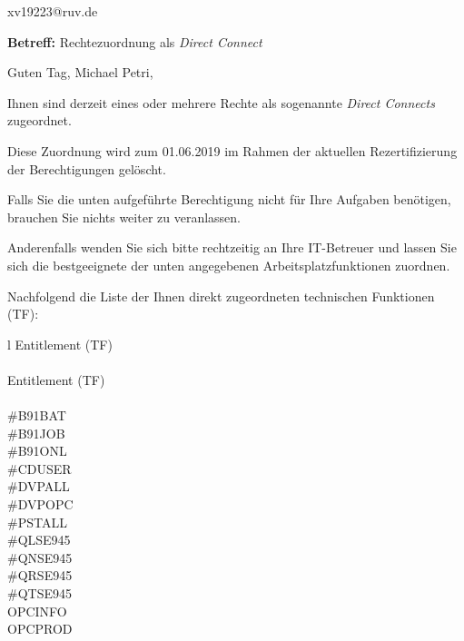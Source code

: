 \documentclass[a4paper,landscape,12pt]{letter}
\begin{document}
\begin{letter}{xv19223@ruv.de\hfill \break}
\begin{normalsize}
	\opening{\textbf{Betreff:} Rechtezuordnung als \emph{Direct Connect}}
	\begin{normalsize} \hfill
	\end{normalsize}

	\begin{normalsize}
		Guten Tag, 
	Michael Petri, \hfill \break
	\end{normalsize}
	\end{normalsize}
	
\begin{normalsize}
	Ihnen sind derzeit eines oder mehrere Rechte als sogenannte \emph{Direct Connects} zugeordnet.
	
	Diese Zuordnung wird zum 01.06.2019 im Rahmen der aktuellen Rezertifizierung der Berechtigungen gelöscht.
	
	Falls Sie die unten aufgeführte Berechtigung nicht für Ihre Aufgaben benötigen, 
	brauchen Sie nichts weiter zu veranlassen.
	
	Anderenfalls wenden Sie sich bitte rechtzeitig an Ihre IT-Betreuer 
	und lassen Sie sich die bestgeeignete der unten angegebenen Arbeitsplatzfunktionen zuordnen.
	\end{normalsize}
	
\begin{normalsize}
	Nachfolgend die Liste der Ihnen direkt zugeordneten technischen Funktionen (TF):

	\begin{longtable}{l}
		Entitlement (TF) \\ \hline
		\endfirsthead
		\\\hline
		Entitlement (TF) \\ \hline
		\endhead %
		\multicolumn{1}{r@{}}{Fortsetzung \ldots}\\
		\endfoot
		\hline
		\endlastfoot
	\#B91BAT\\\#B91JOB\\\#B91ONL\\\#CDUSER\\\#DVPALL\\\#DVPOPC\\\#PSTALL\\\#QLSE945\\\#QNSE945\\\#QRSE945\\\#QTSE945\\OPCINFO\\OPCPROD\\
	\end{longtable}
	\end{normalsize}
	

\end{letter}
\end{document}
